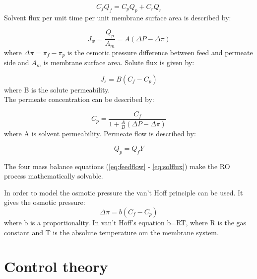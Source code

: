 \begin{equation}
\label{eq:mass}
C_{f}Q_{f}=C_{p}Q_{p}+C_{r}Q_{r}
\end{equation}
Solvent flux per unit time per unit membrane surface area is described by:

\begin{equation}
\label{eq:flux}
J_{w}=\frac{Q_{p}}{A_{m}}= A(\Delta P - \Delta \pi)
\end{equation}
where $\Delta\pi = \pi_{f} - \pi_{p}$ is the osmotic pressure difference between feed and permeate side and $A_{m}$ is membrane surface area.
Solute flux is given by:

\begin{equation}
\label{eq:solflux}
J_{s}=B(C_{f}- C_{p})
\end{equation}
 where B is the solute permeability.
\\The permeate concentration can be described by:

\begin{equation}
\label{eq:permcond}
C_{p}=\frac{C_{f}}{1+\frac{A}{B}(\Delta P - \Delta\pi)}
\end{equation}
where A is solvent permeability.
Permeate flow is described by:

\begin{equation}
\label{eq:permflow}
Q_{p}=Q_{f}Y
\end{equation}

The four mass balance equations (\ref{eq:feedflow} - \ref{eq:solflux}) make the RO process mathematically solvable.

In order to model the osmotic pressure the van't Hoff principle can be used. It gives the osmotic pressure:
\begin{equation}
\label{eq:posm}
\Delta\pi=b(C_{f}-C_{p})
\end{equation}
where b is a proportionality. In van't Hoff's equation b=RT, where R is the gas constant and T is the absolute temperature om the membrane system. 















\section{Control theory}





